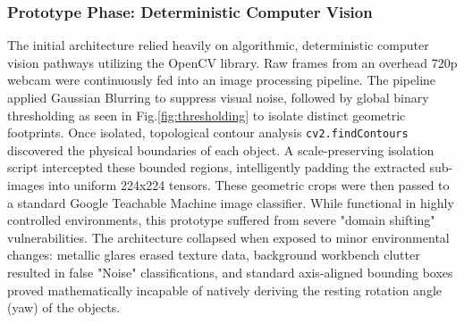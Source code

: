 \documentclass[conference]{IEEEtran}
\begin{document}
\subsubsection{Prototype Phase: Deterministic Computer Vision}
The initial architecture relied heavily on algorithmic, deterministic computer vision pathways utilizing the OpenCV library. Raw frames from an overhead 720p webcam were continuously fed into an image processing pipeline. The pipeline applied Gaussian Blurring to suppress visual noise, followed by global binary thresholding as seen in Fig.\ref{fig:thresholding} to isolate distinct geometric footprints. 
Once isolated, topological contour analysis \texttt{cv2.findContours} discovered the physical boundaries of each object. A scale-preserving isolation script intercepted these bounded regions, intelligently padding the extracted sub-images into uniform 224x224 tensors. These geometric crops were then passed to a standard Google Teachable Machine image classifier. While functional in highly controlled environments, this prototype suffered from severe "domain shifting" vulnerabilities. The architecture collapsed when exposed to minor environmental changes: metallic glares erased texture data, background workbench clutter resulted in false "Noise" classifications, and standard axis-aligned bounding boxes proved mathematically incapable of natively deriving the resting rotation angle (yaw) of the objects.
\end{document}
